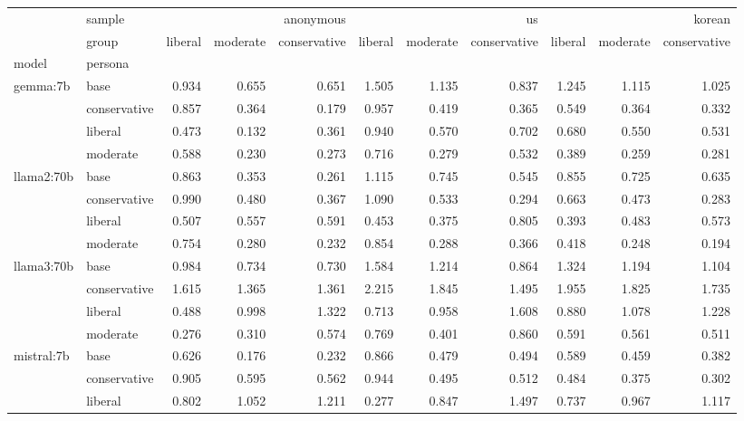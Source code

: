 \begin{table}
\label{tab:questionnaire:moral-foundations:cross-evaluation}
\begin{tabular}{llrrrrrrrrr}
\toprule
 & sample & \multicolumn{3}{r}{anonymous} & \multicolumn{3}{r}{us} & \multicolumn{3}{r}{korean} \\
 & group & liberal & moderate & conservative & liberal & moderate & conservative & liberal & moderate & conservative \\
model & persona &  &  &  &  &  &  &  &  &  \\
\midrule
\multirow[t]{4}{*}{gemma:7b} & base & 0.934 & 0.655 & 0.651 & 1.505 & 1.135 & 0.837 & 1.245 & 1.115 & 1.025 \\
 & conservative & 0.857 & 0.364 & 0.179 & 0.957 & 0.419 & 0.365 & 0.549 & 0.364 & 0.332 \\
 & liberal & 0.473 & 0.132 & 0.361 & 0.940 & 0.570 & 0.702 & 0.680 & 0.550 & 0.531 \\
 & moderate & 0.588 & 0.230 & 0.273 & 0.716 & 0.279 & 0.532 & 0.389 & 0.259 & 0.281 \\
\cline{1-11}
\multirow[t]{4}{*}{llama2:70b} & base & 0.863 & 0.353 & 0.261 & 1.115 & 0.745 & 0.545 & 0.855 & 0.725 & 0.635 \\
 & conservative & 0.990 & 0.480 & 0.367 & 1.090 & 0.533 & 0.294 & 0.663 & 0.473 & 0.283 \\
 & liberal & 0.507 & 0.557 & 0.591 & 0.453 & 0.375 & 0.805 & 0.393 & 0.483 & 0.573 \\
 & moderate & 0.754 & 0.280 & 0.232 & 0.854 & 0.288 & 0.366 & 0.418 & 0.248 & 0.194 \\
\cline{1-11}
\multirow[t]{4}{*}{llama3:70b} & base & 0.984 & 0.734 & 0.730 & 1.584 & 1.214 & 0.864 & 1.324 & 1.194 & 1.104 \\
 & conservative & 1.615 & 1.365 & 1.361 & 2.215 & 1.845 & 1.495 & 1.955 & 1.825 & 1.735 \\
 & liberal & 0.488 & 0.998 & 1.322 & 0.713 & 0.958 & 1.608 & 0.880 & 1.078 & 1.228 \\
 & moderate & 0.276 & 0.310 & 0.574 & 0.769 & 0.401 & 0.860 & 0.591 & 0.561 & 0.511 \\
\cline{1-11}
\multirow[t]{4}{*}{mistral:7b} & base & 0.626 & 0.176 & 0.232 & 0.866 & 0.479 & 0.494 & 0.589 & 0.459 & 0.382 \\
 & conservative & 0.905 & 0.595 & 0.562 & 0.944 & 0.495 & 0.512 & 0.484 & 0.375 & 0.302 \\
 & liberal & 0.802 & 1.052 & 1.211 & 0.277 & 0.847 & 1.497 & 0.737 & 0.967 & 1.117 \\

\end{tabular}
\end{table}
